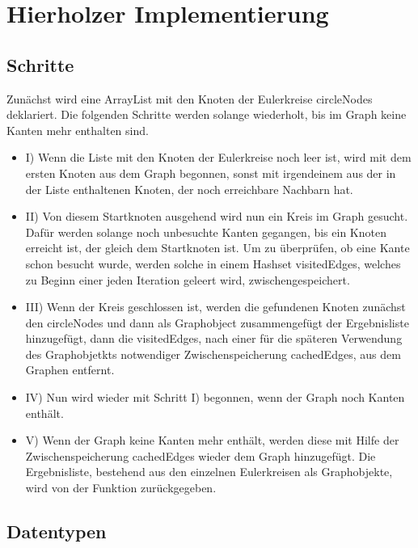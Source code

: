 \section{Hierholzer Implementierung}

\subsection{Schritte}

Zunächst wird eine ArrayList mit den Knoten der Eulerkreise circleNodes deklariert.
Die folgenden Schritte werden solange wiederholt, bis im Graph keine Kanten mehr enthalten sind.\\
\begin{itemize}
    \item I) 
    Wenn die Liste mit den Knoten der Eulerkreise noch leer ist, wird mit dem ersten Knoten aus dem Graph begonnen, sonst mit irgendeinem aus der in der Liste enthaltenen Knoten, der noch erreichbare Nachbarn hat.\\
    \item II) 
    Von diesem Startknoten ausgehend wird nun ein Kreis im Graph gesucht. Dafür werden solange noch unbesuchte Kanten gegangen, bis ein Knoten erreicht ist, der gleich dem Startknoten ist. Um zu überprüfen, ob eine Kante schon besucht wurde, werden solche in einem Hashset visitedEdges, welches zu Beginn einer jeden Iteration geleert wird, zwischengespeichert.\\
    \item III) 
    Wenn der Kreis geschlossen ist, werden die gefundenen Knoten zunächst den circleNodes und dann als Graphobject  zusammengefügt der Ergebnisliste hinzugefügt, dann die visitedEdges, nach einer für die späteren Verwendung des Graphobjetkts notwendiger Zwischenspeicherung cachedEdges, aus dem Graphen entfernt.\\
    \item IV)
    Nun wird wieder mit Schritt I) begonnen, wenn der Graph noch Kanten enthält.
    \item V) 
    Wenn der Graph keine Kanten mehr enthält, werden diese mit Hilfe der Zwischenspeicherung cachedEdges wieder dem Graph hinzugefügt. Die Ergebnisliste, bestehend aus den einzelnen Eulerkreisen als Graphobjekte, wird von der Funktion zurückgegeben.
    
\end{itemize}

\subsection{Datentypen}

